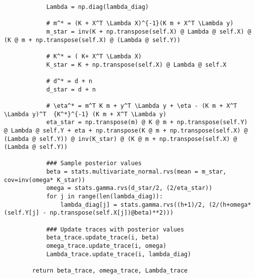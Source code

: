 \documentclass[10pt]{article}
\begin{document}
\begin{lstlisting}
            Lambda = np.diag(lambda_diag)

            # m^* = (K + X^T \Lambda X)^{-1}(K m + X^T \Lambda y)            
            m_star = inv(K + np.transpose(self.X) @ Lambda @ self.X) @ (K @ m + np.transpose(self.X) @ (Lambda @ self.Y))

            # K^* = ( K+ X^T \Lambda X)
            K_star = K + np.transpose(self.X) @ Lambda @ self.X

            # d^* = d + n
            d_star = d + n

            # \eta^* = m^T K m + y^T \Lambda y + \eta - (K m + X^T \Lambda y)^T  {K^*}^{-1} (K m + X^T \Lambda y)
            eta_star = np.transpose(m) @ K @ m + np.transpose(self.Y) @ Lambda @ self.Y + eta + np.transpose(K @ m + np.transpose(self.X) @ (Lambda @ self.Y)) @ inv(K_star) @ (K @ m + np.transpose(self.X) @ (Lambda @ self.Y))

            ### Sample posterior values
            beta = stats.multivariate_normal.rvs(mean = m_star, cov=inv(omega* K_star))
            omega = stats.gamma.rvs(d_star/2, (2/eta_star))
            for j in range(len(lambda_diag)):
                lambda_diag[j] = stats.gamma.rvs((h+1)/2, (2/(h+omega*(self.Y[j] - np.transpose(self.X[j])@beta)**2)))

            ### Update traces with posterior values
            beta_trace.update_trace(i, beta)
            omega_trace.update_trace(i, omega)
            Lambda_trace.update_trace(i, lambda_diag)

        return beta_trace, omega_trace, Lambda_trace
    \end{lstlisting}
\end{document}
